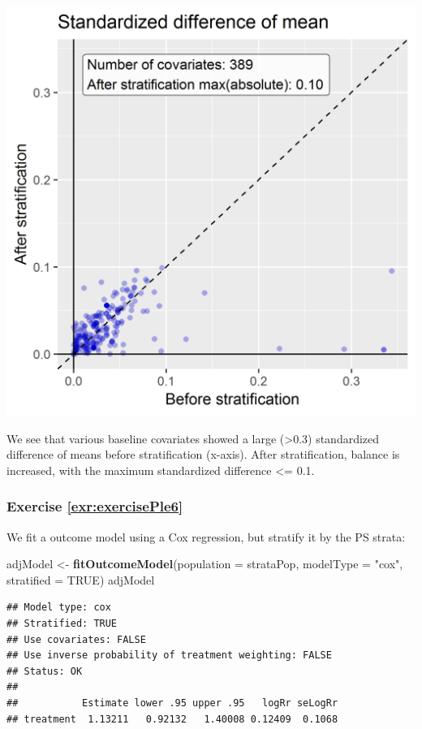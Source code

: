 \documentclass[11pt]{book}
\newenvironment{Shaded}{\begin{snugshade}}{\end{snugshade}}
\newcommand{\KeywordTok}[1]{\textcolor[rgb]{0.13,0.29,0.53}{\textbf{#1}}}
\newcommand{\DataTypeTok}[1]{\textcolor[rgb]{0.13,0.29,0.53}{#1}}
\newcommand{\StringTok}[1]{\textcolor[rgb]{0.31,0.60,0.02}{#1}}
\newcommand{\OtherTok}[1]{\textcolor[rgb]{0.56,0.35,0.01}{#1}}
\newcommand{\NormalTok}[1]{#1}
\theoremstyle{definition}
\theoremstyle{definition}
\theoremstyle{definition}
\theoremstyle{remark}
\begin{document}
\begin{center}\includegraphics[width=0.7\linewidth]{images/SuggestedAnswers/scatter} \end{center}

We see that various baseline covariates showed a large
(\textgreater{}0.3) standardized difference of means before
stratification (x-axis). After stratification, balance is increased,
with the maximum standardized difference \textless{}= 0.1.

\subsubsection*{Exercise
\ref{exr:exercisePle6}}\label{exercise-refexrexerciseple6}

We fit a outcome model using a Cox regression, but stratify it by the PS
strata:

\begin{Shaded}
\begin{Highlighting}[]
\NormalTok{adjModel <-}\StringTok{ }\KeywordTok{fitOutcomeModel}\NormalTok{(}\DataTypeTok{population =}\NormalTok{ strataPop,}
                         \DataTypeTok{modelType =} \StringTok{"cox"}\NormalTok{,}
                         \DataTypeTok{stratified =} \OtherTok{TRUE}\NormalTok{)}
\NormalTok{adjModel}
\end{Highlighting}
\end{Shaded}

\begin{verbatim}
## Model type: cox
## Stratified: TRUE
## Use covariates: FALSE
## Use inverse probability of treatment weighting: FALSE
## Status: OK
## 
##           Estimate lower .95 upper .95   logRr seLogRr
## treatment  1.13211   0.92132   1.40008 0.12409  0.1068
\end{verbatim}
\end{document}

